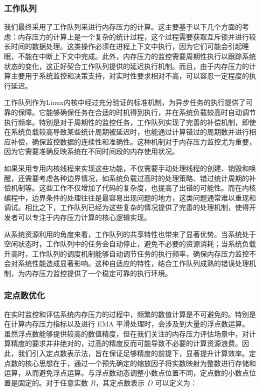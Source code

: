\subsubsection{工作队列}
我们最终采用了工作队列来进行内存压力的计算。这主要基于以下几个方面的考虑：内存压力的计算上是一个复杂的统计过程，这个过程需要获取互斥锁并进行较长时间的数据处理。这类操作必须在进程上下文中执行，因为它们可能会引起睡眠，不能在中断上下文中完成。此外，内存压力的监控需要周期性执行以跟踪系统状态的变化，这正好契合工作队列提供的延迟执行机制。而且，由于内存压力的计算主要用于系统监控和决策支持，对实时性要求相对不高，可以容忍一定程度的执行延迟。

工作队列作为Linux内核中经过充分验证的标准机制，为异步任务的执行提供了可靠的保障。它能够确保任务在合适的时机得到执行，并在系统负载较高时自动调节执行频率。特别是对于周期性的监控任务，工作队列实现了完善的补偿机制，即使在系统负载较高导致某些统计周期被延迟时，也能通过计算错过的周期数并进行相应补偿，确保监控数据的连续性和准确性。这种机制对于内存压力监控尤为重要，因为它需要准确反映系统在不同时间段的内存使用状况。

如果采用专用内核线程来实现这些功能，不仅需要手动处理线程的创建、销毁和唤醒，还需要考虑各种边界情况，如系统负载过高时的处理策略、错过统计周期的补偿机制等。这些工作不仅增加了代码的复杂度，也提高了出错的可能性。而在内核编程中，边界条件的处理往往是最容易出现问题的地方，这类问题通常难以重现和调试。相比之下，工作队列已经为这些复杂的情况提供了完善的处理机制，使得开发者可以专注于内存压力计算的核心逻辑实现。

从系统资源利用的角度来看，工作队列的共享特性也带来了显著优势。当系统处于空闲状态时，工作队列中的任务会自动停止，避免不必要的资源消耗；当系统负载升高时，工作队列的调度机制能够自动调节任务的执行频率，确保内存压力监控不会对系统性能造成显著影响。这种自适应的特性，结合工作队列成熟的错误处理机制，为内存压力监控提供了一个稳定可靠的执行环境。

\subsubsection{定点数优化}
\label{sec:fixed_point_optimization}

在实时监控和评估系统内存压力的过程中，频繁的数值计算是不可避免的。特别是在计算内存压力指标以及进行 EMA 平滑处理时，会涉及到大量的浮点数运算。虽然浮点数能够提供较高的数值精度，但在我们关注的内存压力评估场景中，对计算精度的要求并非绝对的，过高的精度反而可能导致不必要的计算资源浪费。因此，我们引入定点数表示法，旨在保证足够精度的前提下，显著提升计算效率。定点数的核心思想在于，通过一个预先确定的缩放因子将实数映射为整数进行存储和运算，从而避免浮点运算。与浮点数动态调整小数点位置不同，定点数的小数点位置是固定的。对于任意实数 \(R\)，其定点数表示 \(D\) 可以定义为：

